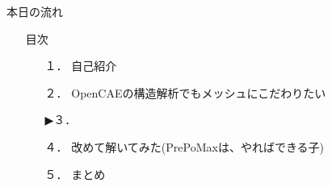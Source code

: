 \begin{frame}{本日の流れ}
  \begin{itemize}
      \item[] 目次
      \begin{itemize}[itemsep=1.3ex, leftmargin=1cm]
        \item[１．] {\color{cud_lightgray} 自己紹介}
        \item[２．] {\color{cud_lightgray} OpenCAEの構造解析でもメッシュにこだわりたい}
        \item[▶３．] 
        \item[４．] 改めて解いてみた(PrePoMaxは、やればできる子)
        \item[５．] まとめ
     \end{itemize}
  \end{itemize}
\end{frame}
